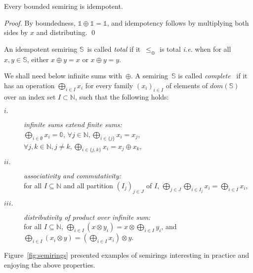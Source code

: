 \documentclass[runningheads]{llncs}
\def\ie{\textit{i.e.}\xspace}
\newcommand{\Semiring}{\mathbb{S}}
\newcommand{\zero}{\mathbb{0}}
\newcommand{\one}{\mathbb{1}}
\newcommand{\dom}{\ensuremath{\mathit{dom}}}
\begin{document}
\begin{lemma}
Every bounded semiring is idempotent.
\end{lemma}
\begin{proof}
By boundedness, $\one \oplus \one = \one$, 
and idempotency follows by multiplying
both sides by $x$ and distributing. 
\qed
\end{proof}

\noindent
An idempotent semiring $\Semiring$~is called \emph{total} if
it~$\leq_\oplus$ is total
\ie when for all $x, y \in \Semiring$, either $x \oplus y = x$ or $x \oplus y = y$.

We shall need below infinite sums with~$\oplus$.
A semiring~$\Semiring$ is called \emph{complete}~\cite{Droste09handbook} 
if it has an %
operation $\bigoplus_{i \in I} x_i$
for every family
$(x_i)_{i \in I}$ %
of elements of $\dom(\Semiring)$ over an index set $I \subset \mathbb{N}$, such that
the following holds: %
\begin{description}
\item[$i.$]
\emph{infinite sums extend finite sums:}\\
$\displaystyle\bigoplus_{i \in \emptyset} x_i = \zero$,\quad 
      $\forall j\in \mathbb{N}, \displaystyle\bigoplus_{i \in \{ j \}} x_i = x_j$,
      $\forall j, k\in \mathbb{N}, j\neq k, 
      \displaystyle\bigoplus_{i \in \{ j, k \}} x_i = x_j \oplus x_k$,
%
\item[$ii.$]
\emph{associativity and commutativity:}\\
for all $I \subseteq \mathbb{N}$
and all partition $(I_{j})_{j \in J}$ of $I$, %
\(
\displaystyle
\bigoplus_{j \in J}\bigoplus_{i \in I_j} x_i = 
\bigoplus_{i \in I} x_i
\),
%
\item[$iii.$] 
\emph{distributivity of product over infinite sum:}\\
for all $I \subseteq \mathbb{N}$,
\(
\displaystyle
\bigoplus_{i \in I} (x \otimes y_i) = x \otimes \bigoplus_{i\in I} y_i\), and
\(
\displaystyle
\bigoplus_{i \in I} (x_i \otimes y) = (\bigoplus_{i \in I} x_i ) \otimes y\).
\end{description}



\begin{example}
Figure~\ref{fig:semirings} presented examples of semirings interesting in practice 
and enjoying the above properties.
\end{example}
\end{document}
